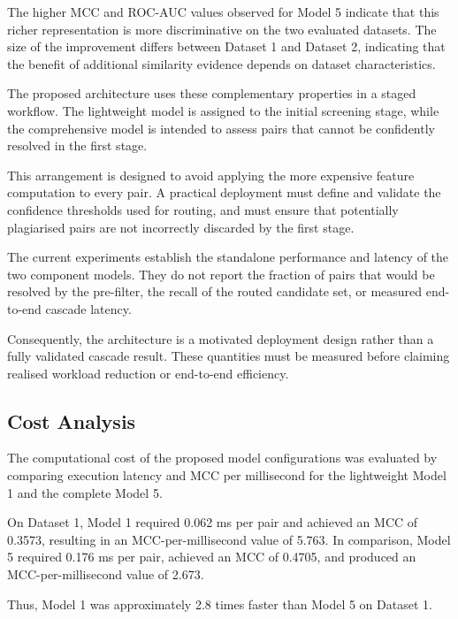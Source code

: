\documentclass[conference]{IEEEtran}
\begin{document}
The higher MCC and ROC-AUC values observed for Model 5
indicate that this richer representation is more discriminative
on the two evaluated datasets. The size of the improvement
differs between Dataset 1 and Dataset 2, indicating that the benefit of
additional similarity evidence depends on dataset
characteristics.

The proposed architecture uses these complementary properties
in a staged workflow. The lightweight model is assigned to the
initial screening stage, while the comprehensive model is
intended to assess pairs that cannot be confidently resolved
in the first stage.

This arrangement is designed to avoid applying the more
expensive feature computation to every pair. A practical
deployment must define and validate the confidence thresholds
used for routing, and must ensure that potentially plagiarised
pairs are not incorrectly discarded by the first stage.

The current experiments establish the standalone performance
and latency of the two component models. They do not report
the fraction of pairs that would be resolved by the pre-filter,
the recall of the routed candidate set, or measured end-to-end
cascade latency.

Consequently, the architecture is a motivated deployment
design rather than a fully validated cascade result. These
quantities must be measured before claiming realised workload
reduction or end-to-end efficiency.

\subsection{Cost Analysis}

The computational cost of the proposed model configurations
was evaluated by comparing execution latency and MCC per
millisecond for the lightweight Model 1 and the complete
Model 5.

On Dataset 1, Model 1 required 0.062 ms per pair and achieved an
MCC of 0.3573, resulting in an MCC-per-millisecond value
of 5.763. In comparison, Model 5 required 0.176 ms per pair,
achieved an MCC of 0.4705, and produced an
MCC-per-millisecond value of 2.673.

Thus, Model 1 was approximately 2.8 times faster than
Model 5 on Dataset 1.

\end{document}
